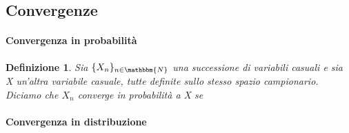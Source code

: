 \documentclass[12pt]{article}
\newtheorem{definizione}{Definizione}
\begin{document}
\subsection{Convergenze}
\paragraph{Convergenza in probabilità}
\begin{definizione}

Sia $\{X_n\}_{n\in\mathbbm{N}}$ una successione di variabili casuali e sia X un'altra variabile casuale, tutte definite sullo stesso spazio campionario.
Diciamo che $X_n$ converge in probabilità a X se
\end{definizione}
\paragraph{Convergenza in distribuzione}
\end{document}
